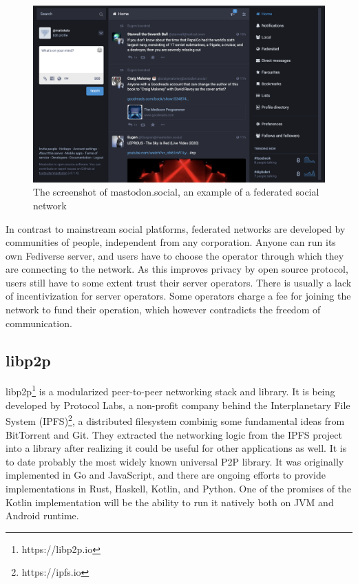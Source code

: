 \begin{figure}
    \centering
    \includegraphics[width=\textwidth]{screens/mastodon}
    \caption{The screenshot of mastodon.social, an example of a federated social network}
    \label{manyverse}
\end{figure}

In contrast to mainstream social platforms, federated networks are developed by communities of people, independent from any corporation. Anyone can run its own Fediverse server, and users have to choose the operator through which they are connecting to the network. As this improves privacy by open source protocol, users still have to some extent trust their server operators. There is usually a lack of incentivization for server operators. Some operators charge a fee for joining the network to fund their operation, which however contradicts the freedom of communication.

\subsection{libp2p}


libp2p\footnote{https://libp2p.io} is a modularized peer-to-peer networking stack and library. It is being developed by Protocol Labs, a non-profit company behind the Interplanetary File System (IPFS)\footnote{https://ipfs.io}, a distributed filesystem combinig some fundamental ideas from BitTorrent and Git. They extracted the networking logic from the IPFS project into a library after realizing it could be useful for other applications as well. It is to date probably the most widely known universal P2P library. It was originally implemented in Go and JavaScript, and there are ongoing efforts to provide implementations in Rust, Haskell, Kotlin, and Python. One of the promises of the Kotlin implementation will be the ability to run it natively both on JVM and Android runtime.

